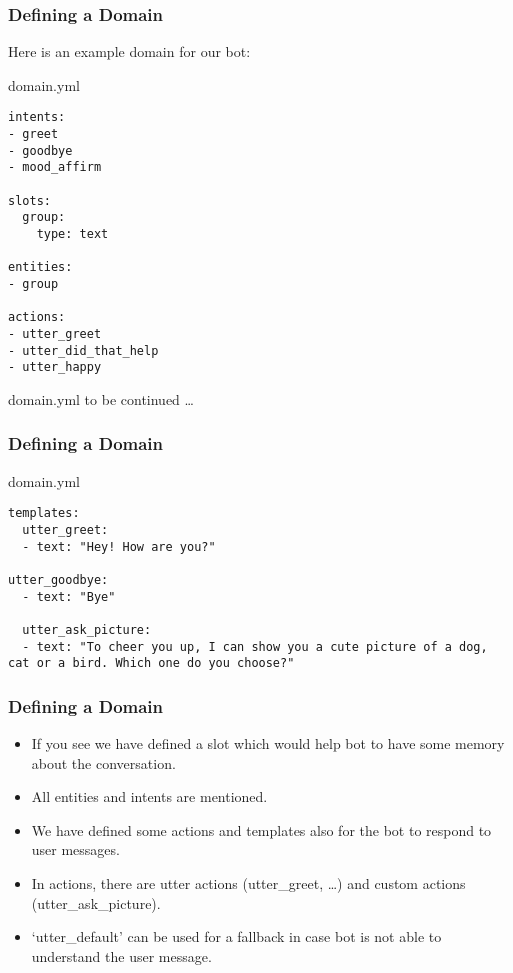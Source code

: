  \begin{frame}[fragile]\frametitle{Defining a Domain}
Here is an example domain for our bot: 

domain.yml

\begin{lstlisting}
intents:
- greet
- goodbye
- mood_affirm

slots:
  group:
    type: text
    
entities:
- group

actions:
- utter_greet
- utter_did_that_help
- utter_happy

\end{lstlisting}

domain.yml to be continued \ldots
\end{frame}

 \begin{frame}[fragile]\frametitle{Defining a Domain}
domain.yml

\begin{lstlisting}
templates:
  utter_greet:
  - text: "Hey! How are you?"
  
utter_goodbye:
  - text: "Bye"
  
  utter_ask_picture:
  - text: "To cheer you up, I can show you a cute picture of a dog, cat or a bird. Which one do you choose?"
\end{lstlisting}

\end{frame}

 \begin{frame}[fragile]\frametitle{Defining a Domain}

\begin{itemize}
\item If you see we have defined a slot which would help bot to have some memory about the conversation. 
\item All entities and intents are mentioned. 
\item We have defined some actions and templates also for the bot to respond to user messages. 
\item In actions, there are utter actions (utter\_greet, \ldots) and custom actions (utter\_ask\_picture). 
\item ‘utter\_default’ can be used for a fallback in case bot is not able to understand the user message.
\end{itemize}

\end{frame}


